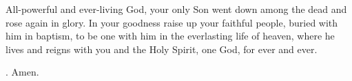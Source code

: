 \lettrine[lines=3]{A}{}ll-powerful and ever-living God,
your only Son went down among the dead
and rose again in glory.
In your goodness
raise up your faithful people,
buried with him in baptism,
to be one with him
in the everlasting life of heaven,
where he lives and reigns with you and the Holy Spirit,
one God, for ever and ever. \par \Rbar. Amen.
